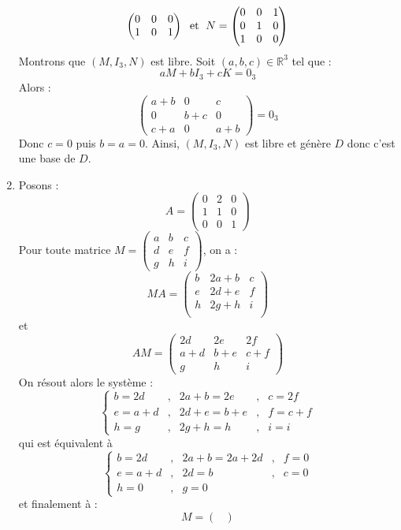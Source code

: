 \documentclass[a4paper,10pt]{report}
\begin{document}
\begin{enumerate}
$$\begin{pmatrix}
0 & 0 & 0 \\
1 & 0 & 1
\end{pmatrix} \; \hbox{ et } \; N = \begin{pmatrix}
0 & 0 & 1 \\
0 & 1 & 0 \\
1 & 0 & 0 
\end{pmatrix}$$
Montrons que $(M,I_3,N)$ est libre. Soit $(a,b,c) \in \mathbb{R}^3$ tel que :
$$ a M + b I_3 + c K = 0_3$$
Alors :
$$ \begin{pmatrix}
a+b & 0 & c \\
0 & b+c & 0 \\
c+a & 0& a+b 
\end{pmatrix} = 0_3 $$
Donc $c=0$ puis $b=a=0$. Ainsi, $(M,I_3,N)$ est libre et génère $D$ donc c'est une base de $D$.
\item Posons :
$$ A = \begin{pmatrix}
0 & 2 & 0 \\
1 & 1 & 0 \\
0 & 0 & 1 
\end{pmatrix}$$
Pour toute matrice $M = \begin{pmatrix}
a & b & c \\
d & e & f \\
g & h & i 
\end{pmatrix}$, on a :
$$ MA = \begin{pmatrix}
b & 2a+b & c\\
e & 2d+e & f \\
h & 2g+h & i \\
\end{pmatrix}$$
et
$$ AM  =\begin{pmatrix}
2d& 2e& 2f \\
a+d & b+e & c+f \\
g & h & i 
\end{pmatrix}$$
On résout alors le système :
$$ \left\lbrace \begin{array}{lclcl}
b= 2d &,& 2a+b=2e &,& c=2f\\
e=a+d &,& 2d+e=b+e &,& f=c+f \\
h=g &,& 2g+h=h&,& i=i
\end{array}\right.$$
qui est équivalent à 
$$ \left\lbrace \begin{array}{lclcl}
b= 2d &,& 2a+b=2a+2d &,& f=0\\
e=a+d &,& 2d=b &,& c=0 \\
h=0 &,& g=0&& 
\end{array}\right.$$
et finalement à :
$$ M = \begin{pmatrix}

\end{pmatrix}$$
\end{enumerate}
\end{document}
